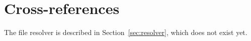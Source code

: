 \section{Cross-references}

The file resolver is described in Section~\ref{sec:resolver}, which does not exist yet.
